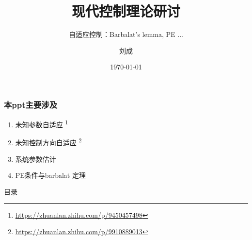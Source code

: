 \documentclass{beamer}
\title{现代控制理论研讨}
\subtitle{自适应控制：Barbalat's lemma, PE ...}
\author{刘成}
\institute{中山大学 航空航天学院}
\date{\today}
\begin{document}
\begin{frame}
  \titlepage
\end{frame}

\begin{frame}
  \frametitle{本ppt主要涉及}
  \begin{enumerate}
    \item 未知参数自适应 \footnote{\url{https://zhuanlan.zhihu.com/p/9450457498}}
    \item 未知控制方向自适应 \footnote{\url{https://zhuanlan.zhihu.com/p/9910889013}}
    \item 系统参数估计
    \item PE条件与barbalat 定理 
  \end{enumerate}
\end{frame}

\begin{frame}{目录}
  \tableofcontents[sectionstyle=show/shaded, subsectionstyle=show/show/shaded]
\end{frame}



\end{document}
